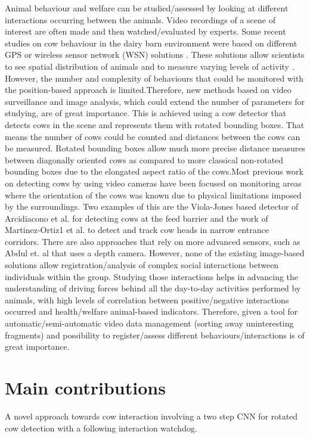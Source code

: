 \documentclass[10pt,a4paper]{article}
\begin{document}
Animal behaviour and welfare can be studied/assessed by looking at different interactions occurring between the animals. Video recordings of a scene of interest are often made and then watched/evaluated by experts. Some recent studies on cow behaviour in the dairy barn environment were based on different GPS or wireless sensor network (WSN) solutions \cite{Nadimietal2012}. These solutions allow scientists to see spatial distribution of animals and to measure varying levels of activity \cite{Nadimietal2012}. However, the number and complexity of behaviours that could be monitored with the position-based approach is limited.Therefore, new methods based on video surveillance and image analysis, which could extend the number of parameters for studying, are of great importance. This is achieved using a cow detector that detects cows in the scene and represents them with rotated bounding boxes. That means the number of cows could be counted and distances between the cows can be measured. Rotated bounding boxes allow much more precise distance measures between diagonally oriented cows as compared to more classical non-rotated bounding boxes due to the elongated aspect ratio of the cows.Most previous work on detecting cows by using video cameras have been focused on monitoring areas where the orientation of the cows was known due to physical limitations imposed by the surroundings. Two examples of this are the Viola-Jones based detector of Arcidiacono et al. \cite{Arcidiacono2012} for detecting cows at the feed barrier and the work of Martinez-Ortiz1 et al. \cite{martinez2013video} to detect and track cow heads in narrow entrance corridors. There are also approaches that rely on more advanced sensors, such as Abdul et. al \cite{abdul2016locomotion} that uses a depth camera. However, none of the existing image-based solutions allow registration/analysis of complex social interactions between individuals within the group. Studying those interactions helps in advancing the understanding of driving forces behind all the day-to-day activities performed by animals, with high levels of correlation between positive/negative interactions occurred and health/welfare  animal-based indicators. Therefore, given a tool for automatic/semi-automatic video data management (sorting away uninteresting fragments) and possibility to register/assess different behaviours/interactions is of great importance. 

\section{Main contributions}
A novel approach towards cow interaction involving a two step CNN for rotated cow detection with a following interaction watchdog.
\end{document}
